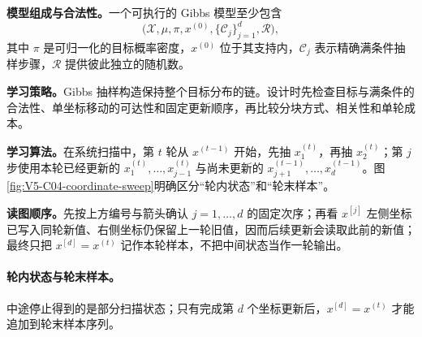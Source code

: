 \documentclass[UTF8,a4paper,11pt,openany]{ctexbook}
\begin{document}
\setcounter{page}{647}
\setcounter{chapter}{33}
\setcounter{figure}{2}
\pagestyle{headings}

\textbf{模型组成与合法性。}一个可执行的 Gibbs 模型至少包含
\[
\bigl(\mathcal X,\mu,\pi,x^{(0)},\{\mathcal C_j\}_{j=1}^d,\mathcal R\bigr),
\]
其中 $\pi$ 是可归一化的目标概率密度，$x^{(0)}$ 位于其支持内，$\mathcal C_j$ 表示精确满条件抽样步骤，$\mathcal R$ 提供彼此独立的随机数。

\textbf{学习策略。}Gibbs 抽样构造保持整个目标分布的链。设计时先检查目标与满条件的合法性、单坐标移动的可达性和固定更新顺序，再比较分块方式、相关性和单轮成本。

\textbf{学习算法。}在系统扫描中，第 $t$ 轮从 $x^{(t-1)}$ 开始，先抽 $x_1^{(t)}$，再抽 $x_2^{(t)}$；第 $j$ 步使用本轮已经更新的 $x_1^{(t)},\ldots,x_{j-1}^{(t)}$ 与尚未更新的 $x_{j+1}^{(t-1)},\ldots,x_d^{(t-1)}$。图\ref{fig:V5-C04-coordinate-sweep}明确区分“轮内状态”和“轮末样本”。

\FloatBarrier
\noindent\textbf{读图顺序。}先按上方编号与箭头确认 $j=1,\ldots,d$ 的固定次序；再看 $x^{[j]}$ 左侧坐标已写入同轮新值、右侧坐标仍保留上一轮旧值，因而后续更新会读取此前的新值；最终只把 $x^{[d]}=x^{(t)}$ 记作本轮样本，不把中间状态当作一轮输出。\par

\paragraph{轮内状态与轮末样本。}中途停止得到的是部分扫描状态；只有完成第 $d$ 个坐标更新后，$x^{[d]}=x^{(t)}$ 才能追加到轮末样本序列。
\end{document}
